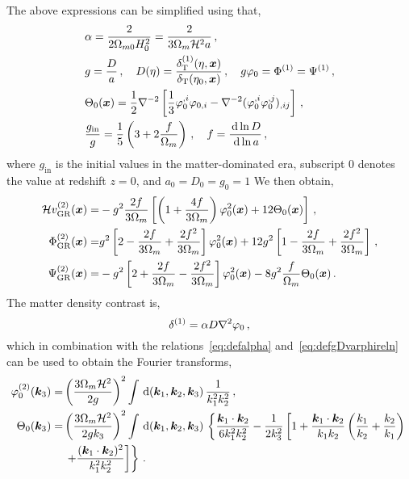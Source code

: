 The above expressions can be simplified using that, 
\begin{align}
	&\alpha = \frac{2}{2 \Omega_{m0} H_0^2} = \frac{2}{3 \Omega_m \mathcal{H}^2 a}\,,\label{eq:defalpha}\\
	& g = \frac{D}{a}\,,\quad D(\eta) = \frac{\delta_\mathrm{T}^{(1)}(\eta,\bm {x})}{\delta_{\mathrm{T}}(\eta_0,\bm {x})}\,,\quad g \varphi_0 = \Phi^{(1)} = \Psi^{(1)}\,,\label{eq:defgDvarphireln} \\
	&\Theta_0(\bm {x}) = \frac{1}{2} \nabla^{-2} \left[ \frac{1}{3} \varphi^{,i}_0 \varphi_{0,i} - \nabla^{-2} (\varphi^{,i}_0 \varphi^{,j}_0)_{,ij} \right]\,,\\
	&\frac{g_\mathrm{in}}{g} = \frac{1}{5} \left( 3 + 2 \frac{f}{\Omega_m} \right)\,,\quad f = \frac{\,\mathrm{d} \ln D}{\,\mathrm{d} \ln a}\,,
\end{align}
where $g_\mathrm{in}$ is the initial values in the matter-dominated era, subscript 0 denotes the value at redshift $z = 0$, and $a_0 = D_0 = g_0 = 1$ 
We then obtain,
\begin{align}
	\mathcal{H} v^{(2)}_{\mathrm{GR}}(\bm {x}) =& -g^2 \frac{2f}{3\Omega_m} \left[ \left( 1 + \frac{4 f}{3 \Omega_m} \right) \varphi_0^2(\bm {x}) + 12 \Theta_0 (\bm {x}) \right]\,,\\
	\Phi^{(2)}_{\mathrm{GR}}(\bm {x}) =& g^2 \left[ 2 - \frac{2 f}{3 \Omega_m} + \frac{2 f^2}{3 \Omega_m} \right] \varphi_0^2(\bm {x}) + 12 g^2 \left[ 1 - \frac{2f}{3 \Omega_m} + \frac{2 f^2}{3 \Omega_m} \right]\,,\\
	\Psi^{(2)}_{\mathrm{GR}}(\bm {x}) =& -g^2 \left[ 2 + \frac{2 f}{3 \Omega_m} - \frac{2 f^2}{3 \Omega_m} \right] \varphi_0^2(\bm {x}) - 8 g^2 \frac{f}{\Omega_m} \Theta_0(\bm {x})\,.
\end{align}
The matter density contrast is, 
\begin{equation}
	\delta^{(1)} = \alpha D \nabla^2 \varphi_0\,,
\end{equation}
which in combination with the relations~\eqref{eq:defalpha} and~\eqref{eq:defgDvarphireln} can be used to obtain the Fourier transforms, 
\begin{align}
	\varphi^{(2)}_0 (\bm {k}_3) =& \left( \frac{3 \Omega_m \mathcal{H}^2 }{2 g} \right)^2 \int\,\mathrm{d}(\bm {k}_1,\bm {k}_2,\bm {k}_3)\, \frac{1}{k_1^2 k_2^2}\,,\\
	\Theta_0(\bm {k}_3) =& \left( \frac{3 \Omega_m \mathcal{H}^2}{2 g k_3} \right)^2 \int \,\mathrm{d}(\bm {k}_1,\bm {k}_2,\bm {k}_3)\,\left\{ \frac{\bm {k}_1 \cdot \bm {k}_2}{6 k_1^2 k_2^2} - \frac{1}{2 k_3^2} \left[ 1 + \frac{\bm {k}_1 \cdot \bm {k}_2}{k_1 k_2} \left( \frac{k_1}{k_2} + \frac{k_2}{k_1} \right) \right. \right. \nonumber \\
	&\left. \left. + \frac{(\bm {k}_1 \cdot \bm {k}_2)^2}{k_1^2 k_2^2} \right] \right\}\,.
\end{align}
